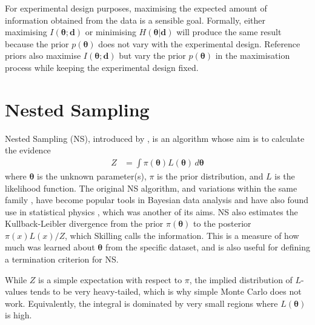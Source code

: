 \documentclass[entropy,article,accept,oneauthor,pdftex,10pt,a4paper]{mdpi}
\newcommand{\revision}{\color{darkblue}}
\renewcommand{\d}{\boldsymbol{d}}
\newcommand{\x}{\boldsymbol{\theta}}
\begin{document}
For experimental design purposes, maximising the expected amount
of information obtained from the data is a sensible goal.
Formally, either maximising $I(\x; \d)$ or
minimising $H(\x | \d)$ will produce the same result because the prior $p(\x)$
does not
vary with the experimental design. Reference priors
\citep{bernardo2005reference} also maximise $I(\x; \d)$ but vary the prior
$p(\x)$
in the maximisation process while keeping the experimental design fixed.

\section{Nested Sampling}

Nested Sampling (NS), introduced by
\citet{skilling2006nested}, is an algorithm whose aim is
to calculate the evidence
\begin{align}
Z &= \int \pi(\x) L(\x) \, d\x
\end{align}
where $\x$ is the unknown parameter(s), $\pi$ is the prior distribution,
and $L$ is the likelihood function. The original NS algorithm, and variations
within the same family \citep{feroz2009multinest, dns, handley2015polychord},
have become popular tools in Bayesian data analysis
\citep{knuth2015bayesian, pullen2014bayesian, exoplanet} and have also
found use in statistical physics \citep{partay2010efficient,
baldock2016determining, martiniani2014superposition}, which was another of
its aims.
{\revision
NS also estimates the Kullback-Leibler divergence from the prior
$\pi(\x)$ to the posterior $\pi(x)L(x)/Z$, which Skilling calls the
information. This is a measure of how much was learned about $\x$
from the specific dataset, and is also useful for defining a termination
criterion for NS.}

While $Z$ is a simple expectation with
respect to $\pi$, the
implied distribution of $L$-values tends to be very heavy-tailed, which is
why simple Monte Carlo does not work. Equivalently, the integral is dominated
by very small regions where $L(\x)$ is high.
\end{document}
